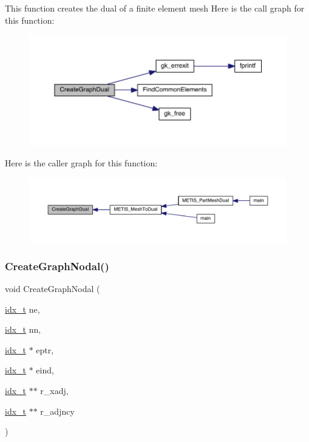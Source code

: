 This function creates the dual of a finite element mesh Here is the call graph for this function\+:\nopagebreak
\begin{figure}[H]
\begin{center}
\leavevmode
\includegraphics[width=350pt]{a00927_a10400dffe4954a697990134da62b387d_cgraph}
\end{center}
\end{figure}
Here is the caller graph for this function\+:\nopagebreak
\begin{figure}[H]
\begin{center}
\leavevmode
\includegraphics[width=350pt]{a00927_a10400dffe4954a697990134da62b387d_icgraph}
\end{center}
\end{figure}
\mbox{\label{a00927_ac6018a712a429b3c401adba913c2cae3}} 
\subsubsection{\texorpdfstring{Create\+Graph\+Nodal()}{CreateGraphNodal()}}
{\footnotesize\ttfamily void Create\+Graph\+Nodal (\begin{DoxyParamCaption}\item[{\hyperlink{a00876_aaa5262be3e700770163401acb0150f52}{idx\+\_\+t}}]{ne,  }\item[{\hyperlink{a00876_aaa5262be3e700770163401acb0150f52}{idx\+\_\+t}}]{nn,  }\item[{\hyperlink{a00876_aaa5262be3e700770163401acb0150f52}{idx\+\_\+t} $\ast$}]{eptr,  }\item[{\hyperlink{a00876_aaa5262be3e700770163401acb0150f52}{idx\+\_\+t} $\ast$}]{eind,  }\item[{\hyperlink{a00876_aaa5262be3e700770163401acb0150f52}{idx\+\_\+t} $\ast$$\ast$}]{r\+\_\+xadj,  }\item[{\hyperlink{a00876_aaa5262be3e700770163401acb0150f52}{idx\+\_\+t} $\ast$$\ast$}]{r\+\_\+adjncy }\end{DoxyParamCaption})}

